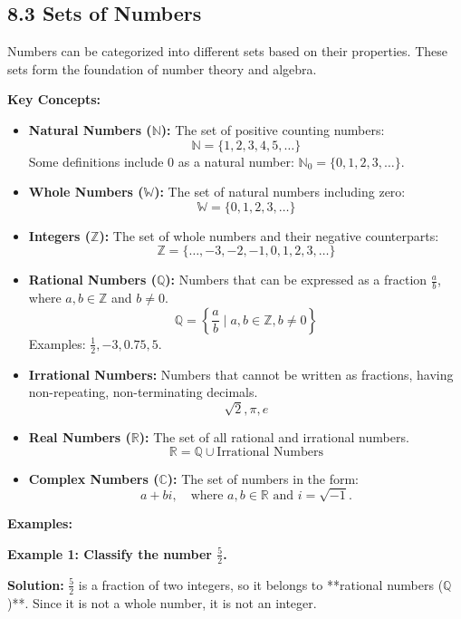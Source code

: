 
\subsection*{8.3 Sets of Numbers}

Numbers can be categorized into different sets based on their properties. These sets form the foundation of number theory and algebra.

\textbf{Key Concepts:}
\begin{itemize}
	\item \textbf{Natural Numbers ($\mathbb{N}$):} The set of positive counting numbers:
	\[
	\mathbb{N} = \{1, 2, 3, 4, 5, \dots\}
	\]
	Some definitions include 0 as a natural number: $\mathbb{N}_0 = \{0, 1, 2, 3, \dots\}$.
	
	\item \textbf{Whole Numbers ($\mathbb{W}$):} The set of natural numbers including zero:
	\[
	\mathbb{W} = \{0, 1, 2, 3, \dots\}
	\]
	
	\item \textbf{Integers ($\mathbb{Z}$):} The set of whole numbers and their negative counterparts:
	\[
	\mathbb{Z} = \{\dots, -3, -2, -1, 0, 1, 2, 3, \dots\}
	\]
	
	\item \textbf{Rational Numbers ($\mathbb{Q}$):} Numbers that can be expressed as a fraction $\frac{a}{b}$, where $a, b \in \mathbb{Z}$ and $b \neq 0$.
	\[
	\mathbb{Q} = \left\{\frac{a}{b} \mid a, b \in \mathbb{Z}, b \neq 0 \right\}
	\]
	Examples: $\frac{1}{2}, -3, 0.75, 5$.
	
	\item \textbf{Irrational Numbers:} Numbers that cannot be written as fractions, having non-repeating, non-terminating decimals.
	\[
	\sqrt{2}, \pi, e
	\]
	
	\item \textbf{Real Numbers ($\mathbb{R}$):} The set of all rational and irrational numbers.
	\[
	\mathbb{R} = \mathbb{Q} \cup \text{Irrational Numbers}
	\]
	
	\item \textbf{Complex Numbers ($\mathbb{C}$):} The set of numbers in the form:
	\[
	a + bi, \quad \text{where } a, b \in \mathbb{R} \text{ and } i = \sqrt{-1}.
	\]
\end{itemize}

\textbf{Examples:}

\begin{flushleft}
	\textbf{Example 1: Classify the number $\frac{5}{2}$.}
	
	\textbf{Solution:}  
	$\frac{5}{2}$ is a fraction of two integers, so it belongs to **rational numbers ($\mathbb{Q}$)**. Since it is not a whole number, it is not an integer.
\end{flushleft}

